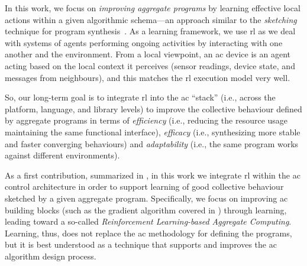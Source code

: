 In this work, we focus on \emph{improving aggregate programs}
 by learning effective local actions
 within a given algorithmic schema---an approach similar to the \emph{sketching} technique for program synthesis~\cite{solar2008program-synthesis-sketching}.
As a learning framework,
 we use \ac{rl} as 
 we deal with systems of agents 
 performing ongoing activities 
 by interacting with one another and the environment. 
% 
From a local viewpoint, an \ac{ac} device is an agent acting based on the local context it perceives (sensor readings, device state, and messages from neighbours), and this matches the \ac{rl} execution model very well.

So, our long-term goal is to integrate \ac{rl} into the \ac{ac} ``stack'' (i.e., across the platform, language, and library levels) to improve the collective behaviour defined by \scafi{} aggregate programs in terms of \emph{efficiency} (i.e., reducing the resource usage maintaining the same functional interface), \emph{efficacy} (i.e., synthesizing more stable and faster converging behaviours) and \emph{adaptability} (i.e., the same program works against different environments).
%

As a first contribution, summarized in , in this work we integrate \ac{rl} within the \ac{ac} control architecture in order to support learning of good collective behaviour sketched by a given aggregate program.
%
Specifically, we focus on improving \ac{ac} building blocks (such as the gradient algorithm covered in ) through learning, leading toward a so-called \emph{Reinforcement Learning-based Aggregate Computing}. 
%
Learning, thus, does not replace the \ac{ac} methodology for defining the programs, but it is best understood as a technique that supports and improves the \ac{ac} algorithm design process. %
%

